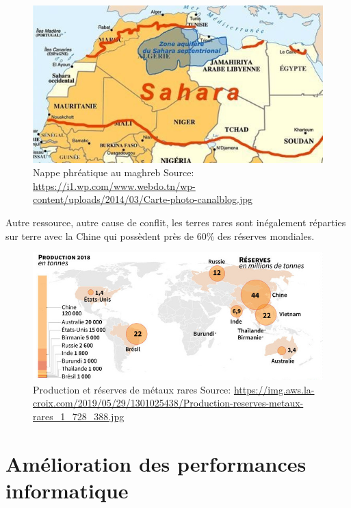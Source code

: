 \begin{figure}
  \centering
  \includegraphics[scale=0.35]{media/zone_aquifere_sahara.jpg}
  \caption{
    Nappe phréatique au maghreb\newline
      \tiny{Source:\newline
        \url{https://i1.wp.com/www.webdo.tn/wp-content/uploads/2014/03/Carte-photo-canalblog.jpg}
      }
  }
  \label{fig:zone_aquifere_sahara}
\end{figure}

Autre ressource, autre cause de conflit, les terres rares sont inégalement réparties
sur terre avec la Chine qui possèdent près de 60\% des réserves mondiales.

\begin{figure}
  \centering
  \includegraphics[scale=0.5]{media/terres_rares.jpg}
  \caption{
    Production et réserves de métaux rares\newline
      \tiny{Source:\newline
        \url{https://img.aws.la-croix.com/2019/05/29/1301025438/Production-reserves-metaux-rares_1_728_388.jpg}
      }
  }
  \label{fig:terre_rare}
\end{figure}

\section{Amélioration des performances informatique}

